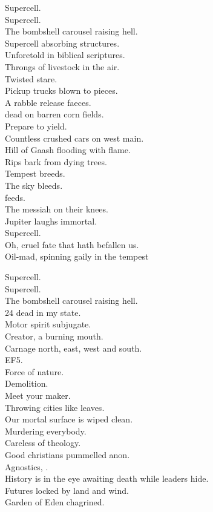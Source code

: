 Supercell. \\
Supercell. \\
The bombshell carousel raising hell. \\

Supercell absorbing structures. \\
Unforetold in biblical scriptures. \\
Throngs of livestock in the air. \\
Twisted stare. \\
Pickup trucks blown to pieces. \\
A rabble release faeces. \\
 dead on barren corn fields. \\
Prepare to yield. \\
Countless crushed cars on west main. \\
Hill of Gaash flooding with flame. \\
Rips bark from dying trees. \\
Tempest breeds. \\
The sky bleeds. \\
 feeds. \\
The messiah on their knees. \\
Jupiter laughs immortal. \\
Supercell. \\

Oh, cruel fate that hath befallen us. \\
Oil-mad, spinning gaily in the tempest\

Supercell. \\
Supercell. \\
The bombshell carousel raising hell. \\

24 dead in my state. \\
Motor spirit subjugate. \\
Creator, a burning mouth. \\
Carnage north, east, west and south. \\
EF5. \\
Force of nature. \\
Demolition. \\
Meet your maker. \\
Throwing cities like leaves. \\
Our mortal surface is wiped clean. \\

Murdering everybody. \\
Careless of theology. \\
Good christians pummelled anon. \\
Agnostics, . \\
History is in the eye awaiting death while leaders hide. \\
Futures locked by land and wind. \\
Garden of Eden chagrined. \\

